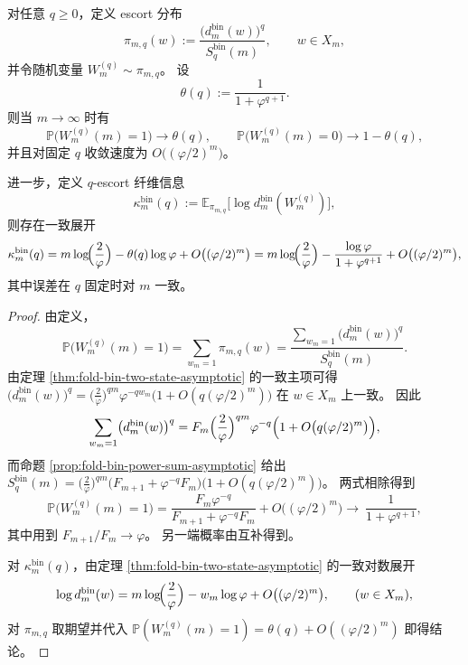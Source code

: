 \begin{proposition}\label{prop:fold-bin-escort-lastbit}
对任意 \(q\ge 0\)，定义 escort 分布
\[
\pi_{m,q}(w):=\frac{\bigl(d^{\mathrm{bin}}_m(w)\bigr)^q}{S_q^{\mathrm{bin}}(m)},\qquad w\in X_m,
\]
并令随机变量 \(W^{(q)}_m\sim\pi_{m,q}\)。
设
\[
\theta(q):=\frac{1}{1+\varphi^{q+1}}.
\]
则当 \(m\to\infty\) 时有
\[
\mathbb{P}\bigl(W^{(q)}_m(m)=1\bigr)\to \theta(q),
\qquad
\mathbb{P}\bigl(W^{(q)}_m(m)=0\bigr)\to 1-\theta(q),
\]
并且对固定 \(q\) 收敛速度为 \(O\bigl((\varphi/2)^m\bigr)\)。

进一步，定义 \(q\)-escort 纤维信息
\[
\kappa^{\mathrm{bin}}_m(q):=\mathbb{E}_{\pi_{m,q}}\bigl[\log d^{\mathrm{bin}}_m(W^{(q)}_m)\bigr],
\]
则存在一致展开
\[
\kappa^{\mathrm{bin}}_m(q)=m\log\!\Bigl(\frac{2}{\varphi}\Bigr)-\theta(q)\log\varphi+O\bigl((\varphi/2)^m\bigr)
=m\log\!\Bigl(\frac{2}{\varphi}\Bigr)-\frac{\log\varphi}{1+\varphi^{q+1}}+O\bigl((\varphi/2)^m\bigr),
\]
其中误差在 \(q\) 固定时对 \(m\) 一致。
\end{proposition}

\begin{proof}
由定义，
\[
\mathbb{P}\bigl(W^{(q)}_m(m)=1\bigr)
=\sum_{w_m=1}\pi_{m,q}(w)
=\frac{\sum_{w_m=1}\bigl(d^{\mathrm{bin}}_m(w)\bigr)^q}{S_q^{\mathrm{bin}}(m)}.
\]
由定理 \ref{thm:fold-bin-two-state-asymptotic} 的一致主项可得
\(
\bigl(d^{\mathrm{bin}}_m(w)\bigr)^q=\bigl(\frac{2}{\varphi}\bigr)^{qm}\varphi^{-qw_m}\bigl(1+O(q(\varphi/2)^m)\bigr)
\)
在 \(w\in X_m\) 上一致。
因此
\[
\sum_{w_m=1}\bigl(d^{\mathrm{bin}}_m(w)\bigr)^q
=F_m\Bigl(\frac{2}{\varphi}\Bigr)^{qm}\varphi^{-q}\Bigl(1+O\bigl(q(\varphi/2)^m\bigr)\Bigr),
\]
而命题 \ref{prop:fold-bin-power-sum-asymptotic} 给出
\(
S_q^{\mathrm{bin}}(m)=\bigl(\frac{2}{\varphi}\bigr)^{qm}\bigl(F_{m+1}+\varphi^{-q}F_m\bigr)\bigl(1+O(q(\varphi/2)^m)\bigr)
\)。
两式相除得到
\[
\mathbb{P}\bigl(W^{(q)}_m(m)=1\bigr)
=\frac{F_m\varphi^{-q}}{F_{m+1}+\varphi^{-q}F_m}+O\bigl((\varphi/2)^m\bigr)
\longrightarrow\ \frac{1}{1+\varphi^{q+1}},
\]
其中用到 \(F_{m+1}/F_m\to\varphi\)。
另一端概率由互补得到。

对 \(\kappa^{\mathrm{bin}}_m(q)\)，由定理 \ref{thm:fold-bin-two-state-asymptotic} 的一致对数展开
\[
\log d^{\mathrm{bin}}_m(w)
=m\log\!\Bigl(\frac{2}{\varphi}\Bigr)-w_m\log\varphi+O\bigl((\varphi/2)^m\bigr),
\qquad (w\in X_m),
\]
对 \(\pi_{m,q}\) 取期望并代入 \(\mathbb{P}(W^{(q)}_m(m)=1)=\theta(q)+O((\varphi/2)^m)\) 即得结论。
\end{proof}


